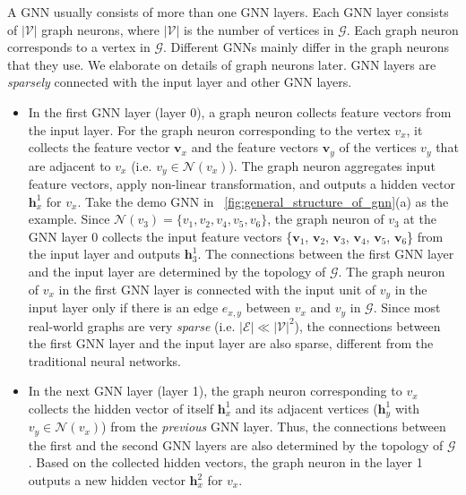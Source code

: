 A GNN usually consists of more than one GNN layers.
%
Each GNN layer consists of $|\mathcal{V}|$ graph neurons, where $|\mathcal{V}|$ is the number of vertices in $\mathcal{G}$.
%
Each graph neuron corresponds to a vertex in $\mathcal{G}$.
%
Different GNNs mainly differ in the graph neurons that they use.
%
We elaborate on details of graph neurons later.
%
GNN layers are \emph{sparsely} connected with the input layer and other GNN layers.
%
\begin{itemize}
    \item In the first GNN layer (layer 0), a graph neuron collects feature vectors from the input layer.
    For the graph neuron corresponding to the vertex $v_x$, it collects the feature vector $\boldsymbol{v}_x$ and the feature vectors $\boldsymbol{v}_y$ of the vertices $v_y$ that are adjacent to $v_x$ (i.e.  $v_y \in \mathcal{N}(v_x)$).
    The graph neuron aggregates input feature vectors, apply non-linear transformation, and outputs a hidden vector $\boldsymbol{h}^1_x$ for $v_x$.
    Take the demo GNN in \figurename~\ref{fig:general_structure_of_gnn}(a) as the example.
    Since $\mathcal{N}(v_3) = \{v_1, v_2, v_4, v_5, v_6\}$, the graph neuron of $v_3$ at the GNN layer 0 collects the input feature vectors \{$\boldsymbol{v}_1$, $\boldsymbol{v}_2$, $\boldsymbol{v}_3$, $\boldsymbol{v}_4$, $\boldsymbol{v}_5$, $\boldsymbol{v}_6$\} from the input layer and outputs $\boldsymbol{h}^1_3$.
    The connections between the first GNN layer and the input layer  are determined by the topology of $\mathcal{G}$.
    The graph neuron of $v_x$ in the first GNN layer is connected with the input unit of $v_y$  in the input layer only if there is an edge $e_{x,y}$ between $v_x$ and $v_y$ in $\mathcal{G}$.
    Since most real-world graphs are very \emph{sparse} (i.e. $|\mathcal{E}| \ll |\mathcal{V}|^2$), the connections between the first GNN layer and the input layer are also sparse, different from the traditional neural networks.
    
    \item In the next GNN layer (layer 1), the graph neuron corresponding to $v_x$ collects the hidden vector of itself $\boldsymbol{h}^1_x$ and its adjacent vertices ($\boldsymbol{h}^1_y$ with $v_y \in \mathcal{N}(v_x)$) from the \emph{previous} GNN layer.
    Thus, the connections between the first and the second GNN layers are also determined by the topology of $\mathcal{G}$.
    Based on the collected hidden vectors, the graph neuron in the layer 1 outputs a new hidden vector $\boldsymbol{h}^2_x$ for $v_x$.
   

\end{itemize}
